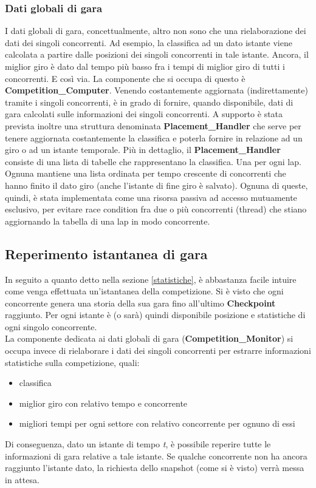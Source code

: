      \subsubsection{Dati globali di gara}
     \label{dati_globali}
     I dati globali di gara, concettualmente, altro non sono che una
rielaborazione dei dati dei singoli concorrenti. Ad esempio, la classifica
     ad un dato istante viene calcolata a partire dalle posizioni dei singoli
concorrenti in tale istante. Ancora, il miglior giro è dato dal
     tempo più basso fra i tempi di miglior giro di tutti i concorrenti. E così
via. La componente che si occupa di questo è \textbf{Competition\_Computer}.
     Venendo costantemente aggiornata (indirettamente) tramite i singoli
concorrenti, è in grado di fornire, quando disponibile, dati di gara
     calcolati sulle informazioni dei singoli concorrenti. A supporto è stata
prevista inoltre una struttura denominata \textbf{Placement\_Handler}
     che serve per tenere aggiornata costantemente la classifica e poterla
fornire in relazione ad un giro o ad un istante temporale.
     Più in dettaglio, il \textbf{Placement\_Handler} consiste di una lista di
tabelle che rappresentano la classifica. Una per ogni lap.
     Ognuna mantiene una lista ordinata per tempo crescente di concorrenti che
hanno finito il dato giro (anche l'istante di fine giro è
     salvato).
     Ognuna di queste, quindi, è stata implementata come una risorsa passiva ad
accesso mutuamente esclusivo, 
     per evitare race condition fra due o più concorrenti (thread) che stiano
aggiornando la tabella di una lap in modo concorrente.
\subsection{Reperimento istantanea di gara}
    In seguito a quanto detto nella sezione \ref{statistiche}, è abbastanza
facile intuire come venga effettuata un'istantanea della competizione.
    Si è visto che ogni concorrente genera una storia della sua gara fino
all'ultimo \textbf{Checkpoint} raggiunto. Per ogni istante è (o sarà)
    quindi disponibile posizione e statistiche di ogni singolo concorrente.\\
    La componente dedicata ai dati globali di gara
(\textbf{Competition\_Monitor}) si occupa invece di rielaborare i dati dei
singoli concorrenti
    per estrarre informazioni statistiche sulla competizione, quali:
    \begin{itemize}
    \item classifica
    \item miglior giro con relativo tempo e concorrente
    \item migliori tempi per ogni settore con relativo concorrente per ognuno di
essi
    \end{itemize}
    Di conseguenza, dato un istante di tempo \emph{t}, è possibile reperire
tutte le informazioni di gara relative a tale istante. Se qualche 
    concorrente non ha ancora raggiunto l'istante dato, la richiesta dello
snapshot (come si è visto) verrà messa in attesa.
